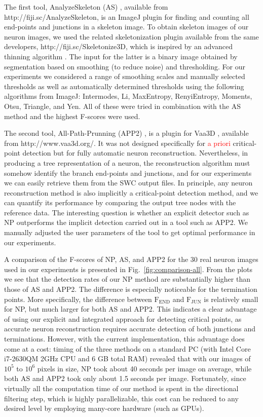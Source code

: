 \documentclass[twocolumn,natbib]{svjour3}
\newcommand{\marked}[1]{\textcolor{red}{#1}}
\begin{document}
The first tool, AnalyzeSkeleton (AS) \citep{arganda20103d}, available from http://fiji.sc/AnalyzeSkeleton, is an ImageJ plugin for finding and counting all end-points and junctions in a skeleton image. To obtain skeleton images of our neuron images, we used the related skeletonization plugin available from the same developers, http://fiji.sc/Skele\-tonize3D, which is inspired by an advanced thinning algorithm \citep{lee1994building}. The input for the latter is a binary image obtained by segmentation based on smoothing (to reduce noise) and thresholding. For our experiments we considered a range of smoothing scales and manually selected thresholds as well as automatically determined thresholds using the following algorithms from ImageJ: Intermodes, Li, MaxEntropy, RenyiEntropy, Moments, Otsu, Triangle, and Yen. All of these were tried in combination with the AS method and the highest F-scores were used.

The second tool, All-Path-Prunning (APP2) \citep{xiao2013app2}, is a plugin for Vaa3D \citep{peng2010v3d,peng2014extensible}, available from http://www.vaa3d.org/. It was not designed specifically for \marked{a priori} critical-point detection but for fully automatic neuron reconstruction. Nevertheless, in producing a tree representation of a neuron, the reconstruction algorithm must somehow identify the branch end-points and junctions, and for our experiments we can easily retrieve them from the SWC output files. In principle, any neuron reconstruction method is also implicitly a critical-point detection method, and we can quantify its performance by comparing the output tree nodes with the reference data. The interesting question is whether an explicit detector such as NP outperforms the implicit detection carried out in a tool such as APP2. We manually adjusted the user parameters of the tool to get optimal performance in our experiments.

A comparison of the F-scores of NP, AS, and APP2 for the 30 real neuron images used in our experiments is presented in Fig.~\ref{fig:comparison-all}. From the plots we see that the detection rates of our NP method are substantially higher than those of AS and APP2. The difference is especially noticeable for the termination points. More specifically, the difference between $\textrm{F}_{\textrm{END}}$ and $\textrm{F}_{\textrm{JUN}}$ is relatively small for NP, but much larger for both AS and APP2. This indicates a clear advantage of using our explicit and integrated approach for detecting critical points, as accurate neuron reconstruction requires accurate detection of both junctions and terminations. However, with the current implementation, this advantage does come at a cost: timing of the three methods on a standard PC (with Intel Core i7-2630QM 2GHz CPU and 6 GB total RAM) revealed that with our images of $10^5$ to $10^6$ pixels in size, NP took about 40 seconds per image on average, while both AS and APP2 took only about 1.5 seconds per image. Fortunately, since virtually all the computation time of our method is spent in the directional filtering step, which is highly parallelizable, this cost can be reduced to any desired level by employing many-core hardware (such as GPUs).
\end{document}
